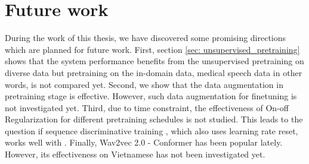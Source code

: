 \section{Future work}

During the work of this thesis, we have discovered some promising directions which are planned for future work.
First, section \ref{sec: unsupervised_pretraining} shows that the system performance benefits from the unsupervised pretraining on diverse data but pretraining on the in-domain data, medical speech data in other words, is not compared yet.
Second, we show that the data augmentation in pretraining stage is effective. However, such data augmentation for finetuning is not investigated yet.
Third, due to time constraint, the effectiveness of On-off Regularization for different pretraining schedules is not studied. 
This leads to the question if sequence discriminative training \cite{gibson2006hypothesis}, which also uses learning rate reset, works well with .
Finally, Wav2vec 2.0 - Conformer \cite{wav2vec2_conformer} has been popular lately. 
However, its effectiveness on Vietnamese has not been investigated yet.
